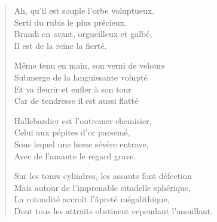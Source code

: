 \begin{verse}%
  \quatrain%
%
%
%
%
%
  Ah, qu’il est souple  l’orbe voluptueux.\\
  Serti du rubis le plus précieux.\\
  Brandi en avant, orgueilleux et galbé,\\
  Il est de la reine la fierté.

  Même tenu en main, son verni de velours\\
  Submerge de la languissante volupté\\
  Et va fleurir et enfler à son tour\\
  Car de tendresse il est aussi flatté

  Hallebardier est l’outremer chemisier,\\
  Celui aux pépites d’or parsemé,\\
  Sous lequel une herse sévère entrave,\\
  Avec de l’amante le regard grave.

  Sur les tours cylindres, les assauts font défection\\
  Mais autour de l’imprenable citadelle sphérique,\\
  La rotondité accroît l’âpreté mégalithique,\\
  Dont tous les attraits obstinent cependant l’assaillant.
\end{verse}


